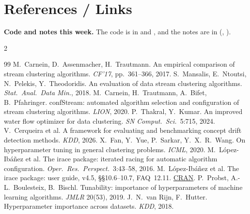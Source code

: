 \section{References / Links}

\noindent\textbf{Code and notes this week.} The code is in  and , and the notes are in  (, ).

\begingroup
\setlength{\columnsep}{1.2em}
\begin{multicols}{2}
\renewcommand{\section}[2]{}%
\begin{thebibliography}{99}
\footnotesize
\setlength{\itemsep}{0pt}\setlength{\parskip}{0pt}
 M.~Carnein, D.~Assenmacher, H.~Trautmann. An empirical comparison of stream clustering algorithms. \emph{CF'17}, pp.~361--366, 2017.
 S.~Mansalis, E.~Ntoutsi, N.~Pelekis, Y.~Theodoridis. An evaluation of data stream clustering algorithms. \emph{Stat.\ Anal.\ Data Min.}, 2018.
 M.~Carnein, H.~Trautmann, A.~Bifet, B.~Pfahringer. confStream: automated algorithm selection and configuration of stream clustering algorithms. \emph{LION}, 2020.
 P.~Thakral, Y.~Kumar. An improved water flow optimizer for data clustering. \emph{SN Comput.\ Sci.}\ 5:715, 2024.
 V.~Cerqueira et al. A framework for evaluating and benchmarking concept drift detection methods. \emph{KDD}, 2026.
 X.~Fan, Y.~Yue, P.~Sarkar, Y.~X.~R.~Wang. On hyperparameter tuning in general clustering problems. \emph{ICML}, 2020.
 M.~L\'opez-Ib\'a\~nez et al. The irace package: iterated racing for automatic algorithm configuration. \emph{Oper.\ Res.\ Perspect.}\ 3:43--58, 2016.
 M.~L\'opez-Ib\'a\~nez et al. The irace package: user guide, v4.5, \S\S10.6--10.7, FAQ~12.11. \href{https://cran.r-project.org/package=irace}{CRAN}.
 P.~Probst, A.-L.~Boulesteix, B.~Bischl. Tunability: importance of hyperparameters of machine learning algorithms. \emph{JMLR} 20(53), 2019.
 J.~N.~van Rijn, F.~Hutter. Hyperparameter importance across datasets. \emph{KDD}, 2018.

\end{thebibliography}
\end{multicols}
